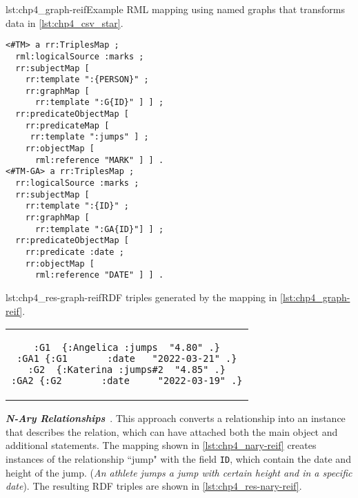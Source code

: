 \begin{minipage}{\linewidth}
\begin{captionedlisting}{lst:chp4_graph-reif}{Example RML mapping using named graphs that transforms data in \cref{lst:chp4_csv_star}.}
\centering
\begin{multicols}{2}
{\begin{lstlisting}[basicstyle=\ttfamily\small,label={list:example1},columns=flexible]
<#TM> a rr:TriplesMap ;
  rml:logicalSource :marks ;
  rr:subjectMap [ 
    rr:template ":{PERSON}" ;
    rr:graphMap [
      rr:template ":G{ID}" ] ] ;
  rr:predicateObjectMap [ 
    rr:predicateMap [
     rr:template ":jumps" ] ;
    rr:objectMap [
      rml:reference "MARK" ] ] .
<#TM-GA> a rr:TriplesMap ;
  rr:logicalSource :marks ;
  rr:subjectMap [ 
    rr:template ":{ID}" ;
    rr:graphMap [
      rr:template ":GA{ID}"] ] ;
  rr:predicateObjectMap [ 
    rr:predicate :date ;
    rr:objectMap [
      rml:reference "DATE" ] ] .
\end{lstlisting}}
\end{multicols}
\end{captionedlisting}
\end{minipage}

\noindent\hspace{0.12\linewidth}\begin{minipage}{\linewidth}
\begin{captionedlisting}{lst:chp4_res-graph-reif}{RDF triples generated by the mapping in \cref{lst:chp4_graph-reif}.}
\centering
\begin{tabular}{c}
\hspace{4em}
{\begin{lstlisting}[basicstyle=\ttfamily\small,label={list:example1},columns=flexible]
:G1  {:Angelica :jumps  "4.80" .}
:GA1 {:G1       :date   "2022-03-21" .}
:G2  {:Katerina :jumps#2  "4.85" .}
:GA2 {:G2       :date     "2022-03-19" .}
\end{lstlisting}}
\end{tabular}
\end{captionedlisting}
\end{minipage}


\textit{\textbf{N-Ary Relationships}}~\citep{naryw3c2006}. This approach  converts a relationship into an instance that describes the relation, which can have attached both the main object and additional statements. The mapping shown in \cref{lst:chp4_nary-reif} creates instances of the relationship ``jump" with the field \texttt{ID}, which contain the date and height of the jump.  (\textit{An athlete jumps a jump with certain height and in a specific date}). 
The resulting RDF triples are shown in \cref{lst:chp4_res-nary-reif}.

